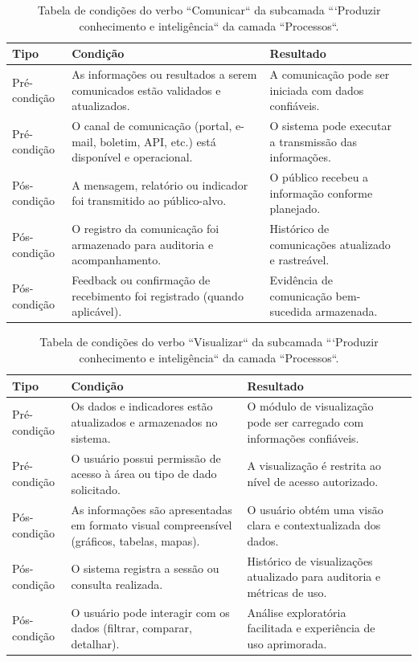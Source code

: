 \begin{apendicesenv}
\begin{table}[H]
\centering
\caption{Tabela de condições do verbo ``Comunicar`` da subcamada ```Produzir conhecimento e inteligência`` da camada ``Processos``.}
\begin{tabularx}{\textwidth}{|l|X|X|X|}
\hline
\textbf{Tipo} & \textbf{Condição} & \textbf{Resultado} \\ \hline
Pré-condição & As informações ou resultados a serem comunicados estão validados e atualizados. & A comunicação pode ser iniciada com dados confiáveis.\\ \hline
Pré-condição & O canal de comunicação (portal, e-mail, boletim, API, etc.) está disponível e operacional. & O sistema pode executar a transmissão das informações.\\ \hline
Pós-condição & A mensagem, relatório ou indicador foi transmitido ao público-alvo. & O público recebeu a informação conforme planejado.\\ \hline
Pós-condição & O registro da comunicação foi armazenado para auditoria e acompanhamento. & Histórico de comunicações atualizado e rastreável.\\ \hline
Pós-condição & Feedback ou confirmação de recebimento foi registrado (quando aplicável). & Evidência de comunicação bem-sucedida armazenada.\\ \hline
\end{tabularx}
\end{table}

\begin{table}[H]
\centering
\caption{Tabela de condições do verbo ``Visualizar`` da subcamada ```Produzir conhecimento e inteligência`` da camada ``Processos``.}
\begin{tabularx}{\textwidth}{|l|X|X|X|}
\hline
\textbf{Tipo} & \textbf{Condição} & \textbf{Resultado} \\ \hline
Pré-condição & Os dados e indicadores estão atualizados e armazenados no sistema. & O módulo de visualização pode ser carregado com informações confiáveis.\\ \hline
Pré-condição & O usuário possui permissão de acesso à área ou tipo de dado solicitado. & A visualização é restrita ao nível de acesso autorizado.\\ \hline
Pós-condição & As informações são apresentadas em formato visual compreensível (gráficos, tabelas, mapas). & O usuário obtém uma visão clara e contextualizada dos dados.\\ \hline
Pós-condição & O sistema registra a sessão ou consulta realizada. & Histórico de visualizações atualizado para auditoria e métricas de uso.\\ \hline
Pós-condição & O usuário pode interagir com os dados (filtrar, comparar, detalhar). & Análise exploratória facilitada e experiência de uso aprimorada.\\ \hline
\end{tabularx}
\end{table}


\end{apendicesenv}
